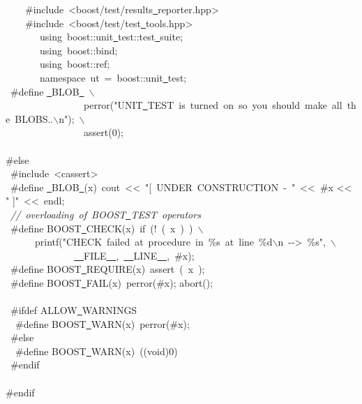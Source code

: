 \documentclass[a4paper,10pt]{article}
\begin{document}
{\ \ \ \ \#include\ <{}boost/test/results\underline\ reporter.hpp>{}\\
\ \ \ \ \#include\ <{}boost/test/test\underline\ tools.hpp>{}\\
\ \ \ \ \ \ \ using\ boost::unit\underline\ test::test\underline\ suite;\\
\ \ \ \ \ \ \ using\ boost::bind;\\
\ \ \ \ \ \ \ using\ boost::ref;\\
\ \ \ \ \ \ \ namespace\ ut\ =\ boost::unit\underline\ test;\ \\
\ \#define \underline\ BLOB\underline\ \ $\backslash$\\
\ \ \ \ \ \ \ \ \ \ \ \ \ \ \ \ perror("{}UNIT\underline\ TEST\ is\ turned\ on\ so\ you\ should\ make\ all\ the\ BLOBS..$\backslash$n"{});\ $\backslash$\\
\ \ \ \ \ \ \ \ \ \ \ \ \ \ \ \ assert(0);\\
\ \ \ \ \ \ \ \\
\#else\\
\ \#include\ <{}cassert>{}\\
\ \#define \underline\ BLOB\underline\ (x)\ cout\ <{}<{}\ "{}[\ UNDER\ CONSTRUCTION\ -{}\ "{}\ <{}<{}\ \#x << " ]"{}\ <{}<{}\ endl;\\
\ \textsl{//\ overloading\ of\ BOOST\underline\ TEST\ operators}\\
\ \#define BOOST\underline\ CHECK(x)\ if\ (!\ (\ x\ )\ )\ $\backslash$\\
\ \ \ \ \ \ printf("{}CHECK\ failed\ at\ procedure\ in\ \%s\ at\ line\ \%d$\backslash$n\ -{}-{}>{}\ \%s"{},\ $\backslash$\\
\ \ \ \ \ \ \ \ \ \ \ \ \ \ \underline\ \underline\ FILE\underline\ \underline\ ,\ \underline\ \underline\ LINE\underline\ \underline\ ,\ \#x);\\
\ \#define BOOST\underline\ REQUIRE(x)\ assert\ (\ x\ );\\
\ \#define BOOST\underline\ FAIL(x)\ perror(\#x); abort();\\
\ \\
\ \#ifdef ALLOW\underline\ WARNINGS\\
\ \ \#define BOOST\underline\ WARN(x)\ perror(\#x);\\
\ \#else\\
\ \ \#define BOOST\underline\ WARN(x)\ ((void)0)\\
\ \#endif\\
\ \\
\#endif\\
\ \\
}
\end{document}
